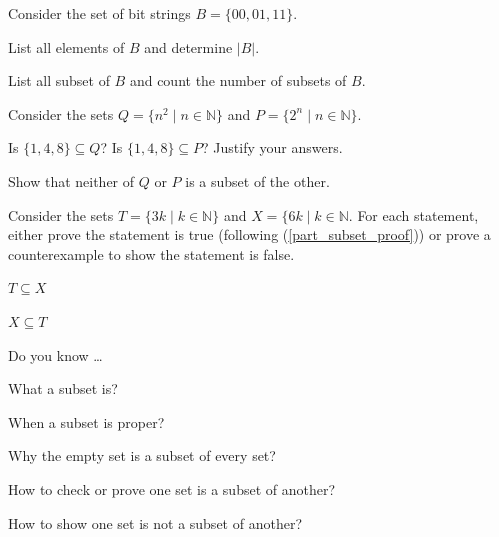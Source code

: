 \begin{exer}[\exerP] %
\label{exer_subset_bs}
    Consider the set of bit strings $B = \{00, 01, 11\}$.
        \begin{exerpart}
            \item List all elements of $B$ and determine $|B|$.
            \item List all subset of $B$ and count the number of subsets of $B$.
        \end{exerpart}
\end{exer}

\begin{exer}[\exerP] %
\label{exer_squares_powers2_subsets}
    Consider the sets $Q = \{ n^2 \mid n \in \mathbb{N}\}$ and $P = \{2^n \mid n \in \mathbb{N}\}$. 
        \begin{apart}
            \item Is $\{1,4,8\} \subseteq Q$?  Is $\{1,4,8\} \subseteq P$?  Justify your answers.
            \item Show that neither of $Q$ or $P$ is a subset of the other.
        \end{apart}
\end{exer}

\begin{exer}[\exerU] %
\label{exer_mult6_subset_mult3}
    Consider the sets $T = \{3k \mid k \in \mathbb{N}\}$ and $X = \{6k \mid k \in \mathbb{N}$.  For each statement, either prove the statement is true (following  (\ref{part_subset_proof})) or prove a counterexample to show the statement is false. 
        \begin{exerpart}
            \item $T \subseteq X$
            \item $X \subseteq T$
        \end{exerpart}
\end{exer}

\begin{exer}[\exerR] %
\label{exer_dyk_subsets}
    Do you know \ldots
        \begin{exerpart}
            \item What a subset is?
            \item When a subset is proper?
            \item Why the empty set is a subset of every set?
            \item How to check or prove one set is a subset of another?
            \item How to show one set is not a subset of another?
        \end{exerpart}
\end{exer}

